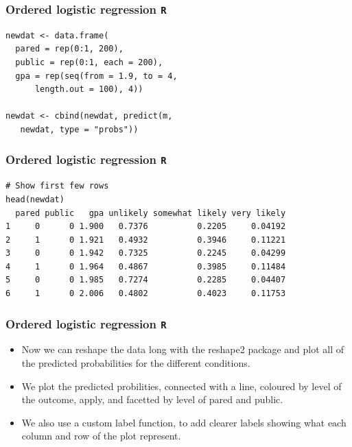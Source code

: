 \documentclass[00-GLMregslides.tex]{subfiles}
\begin{document}
\begin{frame}[fragile]
\frametitle{Ordered logistic regression \texttt{R} }
\Large
\begin{framed}
\begin{verbatim}
newdat <- data.frame(
  pared = rep(0:1, 200),
  public = rep(0:1, each = 200),
  gpa = rep(seq(from = 1.9, to = 4, 
      length.out = 100), 4))

newdat <- cbind(newdat, predict(m, 
   newdat, type = "probs"))

\end{verbatim}
\end{framed}

\end{frame}

\begin{frame}[fragile]
	\frametitle{Ordered logistic regression \texttt{R} }
\normalsize

\begin{verbatim}
# Show first few rows
head(newdat)
  pared public   gpa unlikely somewhat likely very likely
1     0      0 1.900   0.7376          0.2205     0.04192
2     1      0 1.921   0.4932          0.3946     0.11221
3     0      0 1.942   0.7325          0.2245     0.04299
4     1      0 1.964   0.4867          0.3985     0.11484
5     0      0 1.985   0.7274          0.2285     0.04407
6     1      0 2.006   0.4802          0.4023     0.11753
\end{verbatim}


\end{frame}

\begin{frame}[fragile]
\frametitle{Ordered logistic regression \texttt{R} }
\Large
\begin{itemize}
\item Now we can reshape the data long with the reshape2 package and plot all of the predicted probabilities for the different conditions. 
\item We plot the predicted probilities, connected with a line, coloured by level of the outcome, apply, and facetted by level of pared and public.
\item We also use a custom label function, to add clearer labels showing what each column and row of the plot represent.
\end{itemize}
\end{frame}
\end{document}
